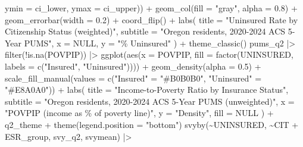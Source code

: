 \documentclass[
  letterpaper,
  DIV=11,
  numbers=noendperiod]{scrartcl}
\newenvironment{Shaded}{\begin{snugshade}}{\end{snugshade}}
\newcommand{\AttributeTok}[1]{\textcolor[rgb]{0.40,0.45,0.13}{#1}}
\newcommand{\ConstantTok}[1]{\textcolor[rgb]{0.56,0.35,0.01}{#1}}
\newcommand{\FloatTok}[1]{\textcolor[rgb]{0.68,0.00,0.00}{#1}}
\newcommand{\FunctionTok}[1]{\textcolor[rgb]{0.28,0.35,0.67}{#1}}
\newcommand{\NormalTok}[1]{\textcolor[rgb]{0.00,0.23,0.31}{#1}}
\newcommand{\OtherTok}[1]{\textcolor[rgb]{0.00,0.23,0.31}{#1}}
\newcommand{\SpecialCharTok}[1]{\textcolor[rgb]{0.37,0.37,0.37}{#1}}
\newcommand{\StringTok}[1]{\textcolor[rgb]{0.13,0.47,0.30}{#1}}
\begin{document}
\begin{Shaded}
\begin{Highlighting}[]
             \AttributeTok{ymin =}\NormalTok{ ci\_lower, }\AttributeTok{ymax =}\NormalTok{ ci\_upper)) }\SpecialCharTok{+}
  \FunctionTok{geom\_col}\NormalTok{(}\AttributeTok{fill =} \StringTok{"gray"}\NormalTok{, }\AttributeTok{alpha =} \FloatTok{0.8}\NormalTok{) }\SpecialCharTok{+}
  \FunctionTok{geom\_errorbar}\NormalTok{(}\AttributeTok{width =} \FloatTok{0.2}\NormalTok{) }\SpecialCharTok{+}
  \FunctionTok{coord\_flip}\NormalTok{() }\SpecialCharTok{+}
  \FunctionTok{labs}\NormalTok{(}
    \AttributeTok{title    =} \StringTok{"Uninsured Rate by Citizenship Status (weighted)"}\NormalTok{,}
    \AttributeTok{subtitle =} \StringTok{"Oregon residents, 2020{-}2024 ACS 5{-}Year PUMS"}\NormalTok{,}
    \AttributeTok{x        =} \ConstantTok{NULL}\NormalTok{,}
    \AttributeTok{y        =} \StringTok{"\% Uninsured"}
\NormalTok{  ) }\SpecialCharTok{+}
  \FunctionTok{theme\_classic}\NormalTok{()}
\NormalTok{pums\_q2 }\SpecialCharTok{|\textgreater{}}
  \FunctionTok{filter}\NormalTok{(}\SpecialCharTok{!}\FunctionTok{is.na}\NormalTok{(POVPIP)) }\SpecialCharTok{|\textgreater{}}
  \FunctionTok{ggplot}\NormalTok{(}\FunctionTok{aes}\NormalTok{(}\AttributeTok{x =}\NormalTok{ POVPIP,}
             \AttributeTok{fill =} \FunctionTok{factor}\NormalTok{(UNINSURED, }\AttributeTok{labels =} \FunctionTok{c}\NormalTok{(}\StringTok{"Insured"}\NormalTok{, }\StringTok{"Uninsured"}\NormalTok{)))) }\SpecialCharTok{+}
  \FunctionTok{geom\_density}\NormalTok{(}\AttributeTok{alpha =} \FloatTok{0.5}\NormalTok{) }\SpecialCharTok{+}
  \FunctionTok{scale\_fill\_manual}\NormalTok{(}\AttributeTok{values =} \FunctionTok{c}\NormalTok{(}\StringTok{"Insured"} \OtherTok{=} \StringTok{"\#B0B0B0"}\NormalTok{, }\StringTok{"Uninsured"} \OtherTok{=} \StringTok{"\#E8A0A0"}\NormalTok{)) }\SpecialCharTok{+}
  \FunctionTok{labs}\NormalTok{(}
    \AttributeTok{title    =} \StringTok{"Income{-}to{-}Poverty Ratio by Insurance Status"}\NormalTok{,}
    \AttributeTok{subtitle =} \StringTok{"Oregon residents, 2020{-}2024 ACS 5{-}Year PUMS (unweighted)"}\NormalTok{,}
    \AttributeTok{x        =} \StringTok{"POVPIP (income as \% of poverty line)"}\NormalTok{,}
    \AttributeTok{y        =} \StringTok{"Density"}\NormalTok{,}
    \AttributeTok{fill     =} \ConstantTok{NULL}
\NormalTok{  ) }\SpecialCharTok{+}
\NormalTok{  q2\_theme }\SpecialCharTok{+}
  \FunctionTok{theme}\NormalTok{(}\AttributeTok{legend.position =} \StringTok{"bottom"}\NormalTok{)}
\FunctionTok{svyby}\NormalTok{(}\SpecialCharTok{\textasciitilde{}}\NormalTok{UNINSURED, }\SpecialCharTok{\textasciitilde{}}\NormalTok{CIT }\SpecialCharTok{+}\NormalTok{ ESR\_group, svy\_q2, svymean) }\SpecialCharTok{|\textgreater{}}

\end{Highlighting}
\end{Shaded}
\end{document}
